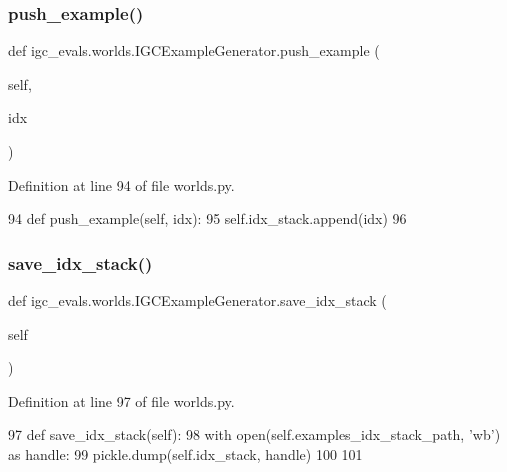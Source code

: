 \subsubsection{\texorpdfstring{push\+\_\+example()}{push\_example()}}
{\footnotesize\ttfamily def igc\+\_\+evals.\+worlds.\+I\+G\+C\+Example\+Generator.\+push\+\_\+example (\begin{DoxyParamCaption}\item[{}]{self,  }\item[{}]{idx }\end{DoxyParamCaption})}



Definition at line 94 of file worlds.\+py.


\begin{DoxyCode}
94     \textcolor{keyword}{def }push\_example(self, idx):
95         self.idx\_stack.append(idx)
96 
\end{DoxyCode}
\mbox{\label{classigc__evals_1_1worlds_1_1IGCExampleGenerator_a3f787da040d9b83d9c857b8ef65d36eb}} 
\subsubsection{\texorpdfstring{save\+\_\+idx\+\_\+stack()}{save\_idx\_stack()}}
{\footnotesize\ttfamily def igc\+\_\+evals.\+worlds.\+I\+G\+C\+Example\+Generator.\+save\+\_\+idx\+\_\+stack (\begin{DoxyParamCaption}\item[{}]{self }\end{DoxyParamCaption})}



Definition at line 97 of file worlds.\+py.


\begin{DoxyCode}
97     \textcolor{keyword}{def }save\_idx\_stack(self):
98         with open(self.examples\_idx\_stack\_path, \textcolor{stringliteral}{'wb'}) \textcolor{keyword}{as} handle:
99             pickle.dump(self.idx\_stack, handle)
100 
101 
\end{DoxyCode}


